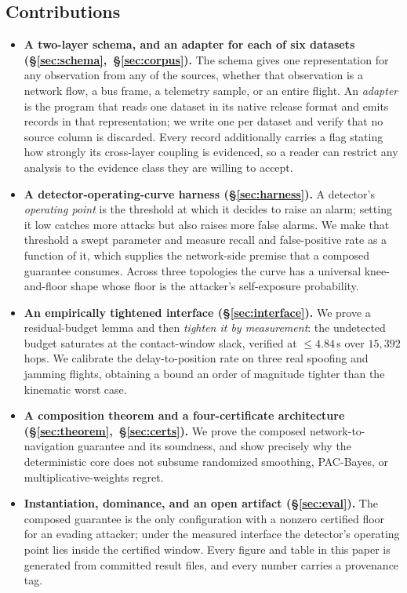 \subsection*{Contributions}
\begin{itemize}
\item \textbf{A two-layer schema, and an adapter for each of six datasets
(\S\ref{sec:schema},~\S\ref{sec:corpus}).} The schema gives one representation
for any observation from any of the sources, whether that observation is a
network flow, a bus frame, a telemetry sample, or an entire flight. An
\emph{adapter} is the program that reads one dataset in its native release
format and emits records in that representation; we write one per dataset and
verify that no source column is discarded. Every record additionally carries a
flag stating how strongly its cross-layer coupling is evidenced, so a reader can
restrict any analysis to the evidence class they are willing to accept.

\item \textbf{A detector-operating-curve harness (\S\ref{sec:harness}).} A
detector's \emph{operating point} is the threshold at which it decides to raise
an alarm; setting it low catches more attacks but also raises more false alarms.
We make that threshold a swept parameter and measure recall and false-positive
rate as a function of it, which supplies the network-side premise that a
composed guarantee consumes. Across three topologies the curve has a universal
knee-and-floor shape whose floor is the attacker's self-exposure probability.

\item \textbf{An empirically tightened interface (\S\ref{sec:interface}).} We
prove a residual-budget lemma and then \emph{tighten it by measurement}: the
undetected budget saturates at the contact-window slack, verified at
$\le 4.84$\,s over $15{,}392$ hops. We calibrate the delay-to-position rate on
three real spoofing and jamming flights, obtaining a bound an order of magnitude
tighter than the kinematic worst case.

\item \textbf{A composition theorem and a four-certificate architecture
(\S\ref{sec:theorem},~\S\ref{sec:certs}).} We prove the composed
network-to-navigation guarantee and its soundness, and show precisely why the
deterministic core does not subsume randomized smoothing, PAC-Bayes, or
multiplicative-weights regret.

\item \textbf{Instantiation, dominance, and an open artifact
(\S\ref{sec:eval}).} The composed guarantee is the only configuration with a
nonzero certified floor for an evading attacker; under the measured interface
the detector's operating point lies inside the certified window. Every figure
and table in this paper is generated from committed result files, and every
number carries a provenance tag.
\end{itemize}

